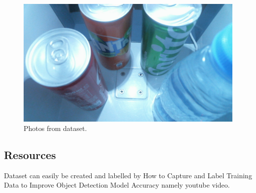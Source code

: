 \begin{figure}[!htbp]
    \centering
    \includegraphics[width=1\textwidth]{Imgs/datasetphotos3.jpg}
    \caption{\label{fig:pic3}Photos from dataset.}
\end{figure}

\subsection{Resources}
Dataset can easily be created and labelled by How to Capture and Label Training Data to Improve Object Detection Model Accuracy namely youtube video.

